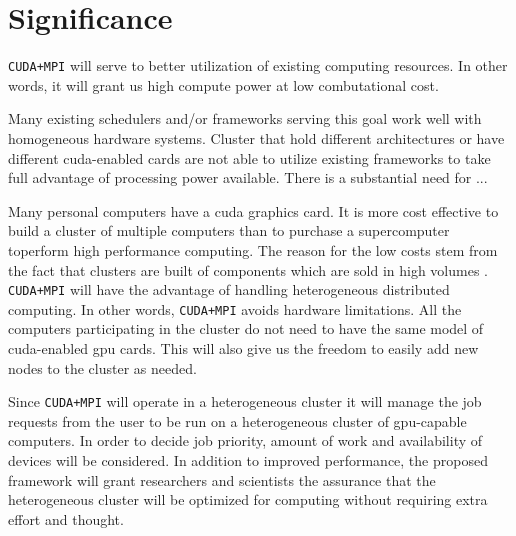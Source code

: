 \section{Significance}
\texttt{CUDA+MPI} will serve to better utilization of existing computing
resources. In other words, it will grant us high compute power at low 
combutational cost.

Many existing schedulers and/or frameworks serving this goal work well with 
homogeneous hardware systems. Cluster that hold different architectures or have 
different \gls{cuda}-enabled cards are not able to utilize existing frameworks 
to take full advantage of processing power available. 
There is a substantial need for ...

Many personal computers have a \gls{cuda} graphics card. It 
is more cost effective to build a cluster of multiple computers than to purchase
a supercomputer toperform high performance computing. The reason for the low 
costs stem from the fact that clusters are built of components which are sold 
in high volumes \cite{erdt2008automatic}. \texttt{CUDA+MPI} will have the 
advantage of handling heterogeneous distributed computing. In other words, 
\texttt{CUDA+MPI} avoids hardware limitations. All the computers participating 
in the cluster do not need to have the same model of \gls{cuda}-enabled 
\gls{gpu} cards. This will also give us the freedom to easily add new nodes to 
the cluster as needed.

Since \texttt{CUDA+MPI} will operate in a heterogeneous cluster it will manage
the job requests from the user to be run on a heterogeneous cluster of
\gls{gpu}-capable computers. In order to decide job priority, amount of work
and availability of devices will be considered. In addition to improved
performance, the proposed framework will grant researchers and scientists the
assurance that the heterogeneous cluster will be optimized for computing
without requiring extra effort and thought.
